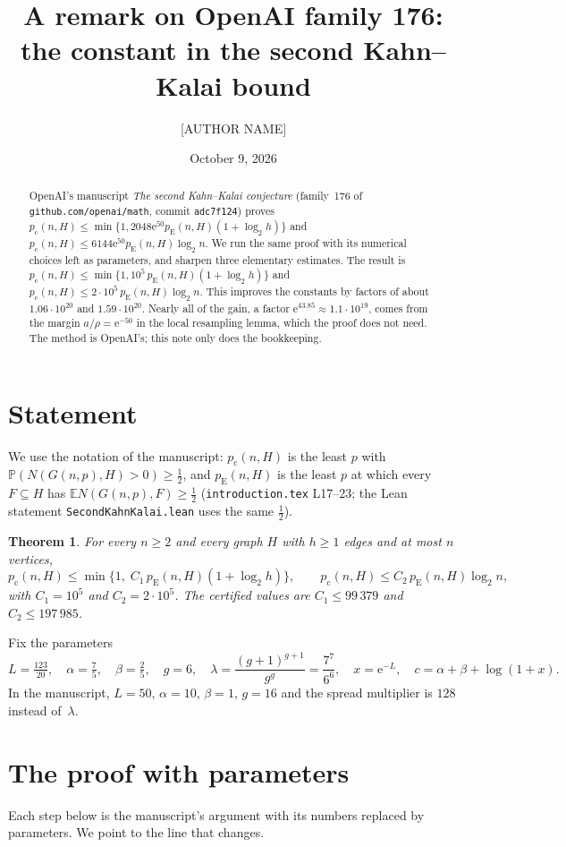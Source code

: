\documentclass[11pt]{amsart}
\title{A remark on OpenAI family 176: the constant in the second Kahn--Kalai bound}
\author{[AUTHOR NAME]}
\date{October 9, 2026}
\newtheorem{theorem}{Theorem}
\theoremstyle{remark}
\newcommand{\PP}{\mathbb P}
\newcommand{\EE}{\mathbb E}
\newcommand{\pc}{p_{\mathrm c}}
\newcommand{\pE}{p_{\mathrm E}}
\newcommand{\ee}{\mathrm e}
\begin{document}
\begin{abstract}
OpenAI's manuscript \emph{The second Kahn--Kalai conjecture} (family~176 of
\texttt{github.com/openai/math}, commit \texttt{adc7f124}) proves
$\pc(n,H)\le\min\{1,2048\ee^{50}\pE(n,H)(1+\log_2 h)\}$ and
$\pc(n,H)\le 6144\ee^{50}\pE(n,H)\log_2 n$.
We run the same proof with its numerical choices left as parameters, and
sharpen three elementary estimates. The result is
$\pc(n,H)\le\min\{1,10^5\,\pE(n,H)(1+\log_2 h)\}$ and
$\pc(n,H)\le 2\cdot10^5\,\pE(n,H)\log_2 n$. This improves the constants by
factors of about $1.06\cdot10^{20}$ and $1.59\cdot10^{20}$. Nearly all of the
gain, a factor $\ee^{43.85}\approx1.1\cdot10^{19}$, comes from the margin
$a/\rho=\ee^{-50}$ in the local resampling lemma, which the proof does not
need. The method is OpenAI's; this note only does the bookkeeping.
\end{abstract}
\maketitle

\section{Statement}
We use the notation of the manuscript: $\pc(n,H)$ is the least $p$ with
$\PP(N(G(n,p),H)>0)\ge\frac12$, and $\pE(n,H)$ is the least $p$ at which every
$F\subseteq H$ has $\EE N(G(n,p),F)\ge\frac12$ (\texttt{introduction.tex}
L17--23; the Lean statement \texttt{SecondKahnKalai.lean} uses the same $\frac12$).

\begin{theorem}\label{thm:main}
For every $n\ge2$ and every graph $H$ with $h\ge1$ edges and at most $n$ vertices,
\[
\pc(n,H)\le\min\{1,\;C_1\,\pE(n,H)(1+\log_2h)\},\qquad
\pc(n,H)\le C_2\,\pE(n,H)\log_2 n,
\]
with $C_1=10^5$ and $C_2=2\cdot10^5$. The certified values are
$C_1\le 99\,379$ and $C_2\le197\,985$.
\end{theorem}

Fix the parameters
\[
L=\tfrac{123}{20},\quad \alpha=\tfrac75,\quad \beta=\tfrac25,\quad g=6,\quad
\lambda=\frac{(g+1)^{g+1}}{g^g}=\frac{7^7}{6^6},\quad x=\ee^{-L},\quad
c=\alpha+\beta+\log(1+x).
\]
In the manuscript, $L=50$, $\alpha=10$, $\beta=1$, $g=16$ and the spread
multiplier is $128$ instead of~$\lambda$.

\section{The proof with parameters}
Each step below is the manuscript's argument with its numbers replaced by
parameters. We point to the line that changes.
\end{document}
